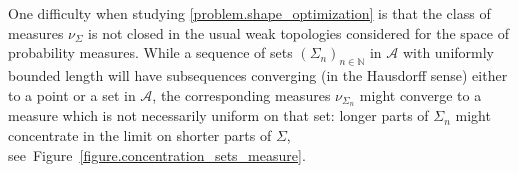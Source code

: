 \documentclass[JEP,XML,SOM,Unicode,NoFloatCountersInSection,published]{cedram}
\theoremstyle{definition}
\begin{document}
One difficulty when studying \eqref{problem.shape_optimization} is that the class of measures $\nu_\Sigma$ is not closed in the usual weak topologies considered for the space of probability measures.
While a sequence of sets $(\Sigma_{n})_{n\in \mathbb{N}}$ in $\mathcal{A}$ with uniformly bounded length will have subsequences converging (in the Hausdorff sense) either to a point or a set in $\mathcal{A}$, the corresponding measures $\nu_{\Sigma_n}$ might converge to a measure which is not necessarily uniform on that set: longer parts of $\Sigma_n$ might concentrate in the limit on shorter parts of $\Sigma$, see~Figure~\ref{figure.concentration_sets_measure}.
\begin{figure}[t]
\centering

\end{figure}
\end{document}

